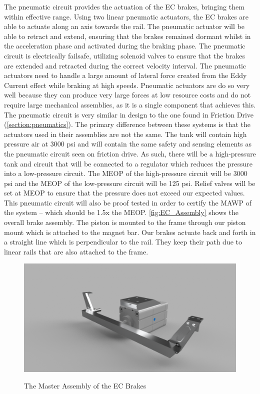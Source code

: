 \documentclass[main.tex]{subfiles}
\begin{document}
    The pneumatic circuit provides the actuation of the EC brakes, bringing them within effective range. Using two linear pneumatic actuators, the EC brakes are able to actuate along an axis towards the rail. The pneumatic actuator will be able to retract and extend, ensuring that the brakes remained dormant whilst in the acceleration phase and activated during the braking phase. The pneumatic circuit is electrically failsafe, utilizing solenoid valves to ensure that the brakes are extended and retracted during the correct velocity interval. The pneumatic actuators need to handle a large amount of lateral force created from the Eddy Current effect while braking at high speeds. Pneumatic actuators are do so very well because they can produce very large forces at low resource costs and do not require large mechanical assemblies, as it is a single component that achieves this. The pneumatic circuit is very similar in design to the one found in Friction Drive (\autoref{section:pneumatics}). The primary difference between these systems is that the actuators used in their assemblies are not the same.
    The tank will contain high pressure air at 3000 psi and will contain the same safety and sensing elements as the pneumatic circuit seen on friction drive. As such, there will be a high-pressure tank and circuit that will be connected to a regulator which reduces the pressure into a low-pressure circuit. The MEOP of the high-pressure circuit will be 3000 psi and the MEOP of the low-pressure circuit will be 125 psi. Relief valves will be set at MEOP to ensure that the pressure does not exceed our expected values. This pneumatic circuit will also be proof tested in order to certify the MAWP of the system – which should be 1.5x the MEOP.
    \autoref{fig:EC_Assembly} shows the overall brake assembly. The piston is mounted to the frame through our piston mount which is attached to the magnet bar. Our brakes actuate back and forth in a straight line which is perpendicular to the rail. They keep their path due to linear rails that are also attached to the frame.
    \begin{figure}[H]
    	\centering
        \includegraphics[width=\linewidth]{images/EC_Brake_Master_2018}
        \label{fig:EC_Assembly}
        \caption{The Master Assembly of the EC Brakes}
    \end{figure}
\end{document}
